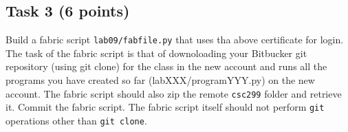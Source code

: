 \documentclass[12pt]{article}
\begin{document}
\subsection{Task 3 (6 points)}

Build a fabric script {\tt lab09/fabfile.py} that uses tha above certificate for login. The task of the fabric script is that of downoloading your Bitbucker git repository (using git clone) for the class in the new account and runs all the programs you have created so far (labXXX/programYYY.py) on the new account. The fabric script should also zip the remote {\tt csc299} folder and retrieve it. Commit the fabric script. The fabric script itself should not perform {\tt git} operations other than {\tt git clone}.
\end{document}
